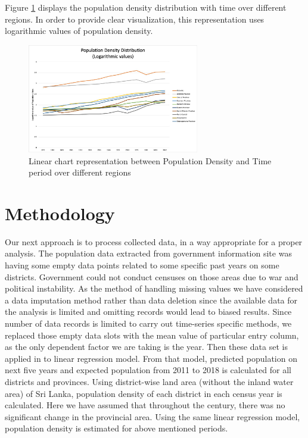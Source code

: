 \documentclass[conference]{IEEEtran}
\begin{document}
Figure \ref{fig:figure3} displays the population density distribution with time over different regions. In order to provide clear visualization, this representation uses logarithmic values of population density.

\begin{figure}
\centering
\includegraphics[width=7.5cm]{pop-den-time.jpeg}
\caption{Linear chart representation between Population Density and Time period over different regions}
\label{fig:figure3}
\end{figure}


\section{Methodology}

Our next approach is to process collected data, in a way appropriate for a proper analysis. The population data extracted from government information site was having some empty data points related to some specific past years on some districts. Government could not conduct censuses on those areas due to war and political instability. As the method of handling missing values we have considered a data imputation method rather than data deletion since the available data for the analysis is limited and omitting records would lead to biased results. Since number of data records is limited to carry out time-series specific methods, we replaced those empty data slots with the mean value of particular entry column, as the only dependent factor we are taking is the year. Then these data set is applied in to linear regression model. From that model, predicted population on next five years and expected population from 2011 to 2018 is calculated for all districts and provinces. Using district-wise land area (without the inland water area) of Sri Lanka, population density of each district in each census year is calculated. Here we have assumed that throughout the century, there was no significant change in the provincial area. Using the same linear regression model, population density is estimated for above mentioned periods. 
\end{document}
